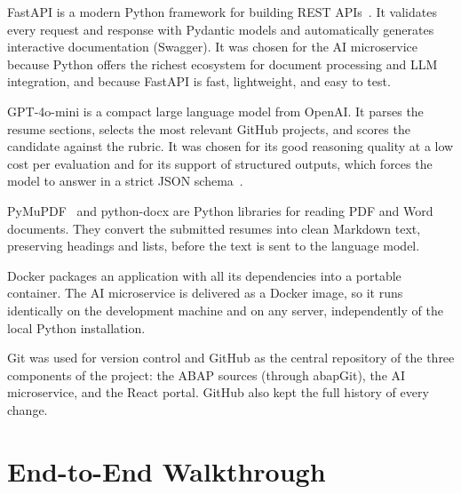 FastAPI is a modern Python framework for building REST APIs~\cite{fastapi}. It validates every request and response with Pydantic models and automatically generates interactive documentation (Swagger). It was chosen for the AI microservice because Python offers the richest ecosystem for document processing and LLM integration, and because FastAPI is fast, lightweight, and easy to test.

GPT-4o-mini is a compact large language model from OpenAI. It parses the resume sections, selects the most relevant GitHub projects, and scores the candidate against the rubric. It was chosen for its good reasoning quality at a low cost per evaluation and for its support of structured outputs, which forces the model to answer in a strict JSON schema~\cite{openai_structured}.

PyMuPDF~\cite{pymupdf} and python-docx are Python libraries for reading PDF and Word documents. They convert the submitted resumes into clean Markdown text, preserving headings and lists, before the text is sent to the language model.

Docker packages an application with all its dependencies into a portable container. The AI microservice is delivered as a Docker image, so it runs identically on the development machine and on any server, independently of the local Python installation.

Git was used for version control and GitHub as the central repository of the three components of the project: the ABAP sources (through abapGit), the AI microservice, and the React portal. GitHub also kept the full history of every change.

\section{End-to-End Walkthrough}
\label{sec:walkthrough}

